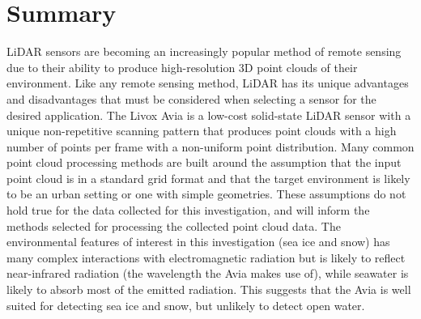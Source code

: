 \section{Summary}
\label{sec:ch3:section6}

\ac{LiDAR} sensors are becoming an increasingly popular method of remote sensing due to their ability to produce high-resolution 3D point clouds of their environment. Like any remote sensing method, \ac{LiDAR} has its unique advantages and disadvantages that must be considered when selecting a sensor for the desired application. The Livox Avia is a low-cost solid-state \ac{LiDAR} sensor with a unique non-repetitive scanning pattern that produces point clouds with a high number of points per frame with a non-uniform point distribution. Many common point cloud processing methods are built around the assumption that the input point cloud is in a standard grid format and that the target environment is likely to be an urban setting or one with simple geometries. These assumptions do not hold true for the data collected for this investigation, and will inform the methods selected for processing the collected point cloud data. The environmental features of interest in this investigation (sea ice and snow) has many complex interactions with electromagnetic radiation but is likely to reflect near-infrared radiation (the wavelength the Avia makes use of), while seawater is likely to absorb most of the emitted radiation. This suggests that the Avia is well suited for detecting sea ice and snow, but unlikely to detect open water.

